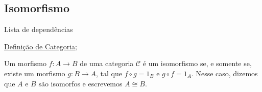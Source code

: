 \subsection{Isomorfismo}
\label{isomorfismo-em-categorias-def}
\begin{titlemize}{Lista de dependências}
	\item \hyperref[categorias-def]{Definição de Categoria};\\ %
\end{titlemize}
\begin{defi}[Isomorfismo]
	Um morfismo $f:A \longrightarrow B$ de uma categoria $\mathcal{C}$ é um isomorfismo se, e somente se, existe um morfismo $g:B \longrightarrow A$, tal que $f \circ g = 1_B$ e $g \circ f = 1_A$. Nesse caso, dizemos que $A$ e $B$ são isomorfos e escrevemos $A \cong B$.
\end{defi}


